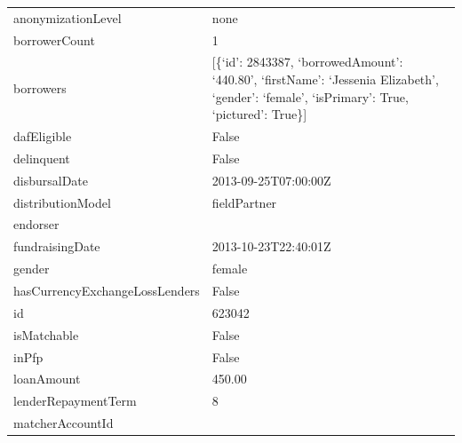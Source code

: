 \begin{longtable}{|p{}|p{}|}
	anonymizationLevel                   & none                                                                \\
	borrowerCount                        & 1                                                                   \\
	borrowers                            & {[}\{`id': 2843387, `borrowedAmount': `440.80', `firstName':
	`Jessenia Elizabeth', `gender': `female', `isPrimary': True, `pictured':
	True\}{]}                                                                                                  \\
	dafEligible                          & False                                                               \\
	delinquent                           & False                                                               \\
	disbursalDate                        & 2013-09-25T07:00:00Z                                                \\
	distributionModel                    & fieldPartner                                                        \\
	endorser                             &                                                                     \\
	fundraisingDate                      & 2013-10-23T22:40:01Z                                                \\
	gender                               & female                                                              \\
	hasCurrencyExchangeLossLenders       & False                                                               \\
	id                                   & 623042                                                              \\
	isMatchable                          & False                                                               \\
	inPfp                                & False                                                               \\
	loanAmount                           & 450.00                                                              \\
	lenderRepaymentTerm                  & 8                                                                   \\
	matcherAccountId                     &                                                                     \\

\end{longtable}
